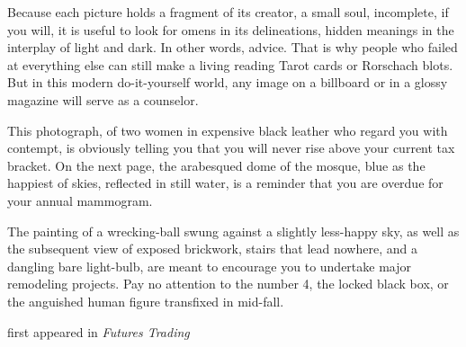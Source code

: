 Because each picture holds a fragment of its creator, a small soul,
incomplete, if you will, it is useful to look for omens in its
delineations, hidden meanings in the interplay of light and dark. In
other words, advice. That is why people who failed at everything else
can still make a living reading Tarot cards or Rorschach blots. But in
this modern do-it-yourself world, any image on a billboard or in a
glossy magazine will serve as a counselor.

This photograph, of two women in expensive black leather who regard you
with contempt, is obviously telling you that you will never rise above
your current tax bracket. On the next page, the arabesqued dome of the
mosque, blue as the happiest of skies, reflected in still water, is a
reminder that you are overdue for your annual mammogram.

The painting of a wrecking-ball swung against a slightly less-happy sky,
as well as the subsequent view of exposed brickwork, stairs that lead
nowhere, and a dangling bare light-bulb, are meant to encourage you to
undertake major remodeling projects. Pay no attention to the number 4,
the locked black box, or the anguished human figure transfixed in
mid-fall.

first appeared in \emph{Futures Trading}
